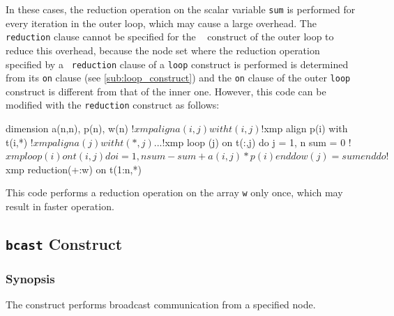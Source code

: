 \begin{description}

In these cases, the reduction operation on the scalar variable {\tt sum}
is performed for every iteration in the outer loop, which may cause a
large overhead.
The {\tt reduction} clause cannot be specified for the {\tt
{}} construct of the outer loop to reduce this overhead,
%
because the node set where the reduction operation specified by a {\tt
reduction} clause of a {\tt loop} construct is performed is determined
from its {\tt on} clause (see \ref{sub:loop_construct}) and
the {\tt on} clause of the outer {\tt loop} construct is different from
that of the inner one. 
%
However, this code can be modified with the {\tt reduction}
construct as follows: 

\begin{XFexample}
      dimension a(n,n), p(n), w(n)
!$xmp align a(i,j) with t(i,j)
!$xmp align p(i) with t(i,*)
!$xmp align a(j) with t(*,j)
      ...
!$xmp loop (j) on t(:,j)
      do j = 1, n
          sum = 0
!$xmp loop (i) on t(i,j) 
          do i = 1, n
              sum - sum + a(i,j) * p(i)
          end do
          w(j) = sum
      end do
!$xmp reduction(+:w) on t(1:n,*)
\end{XFexample}

This code performs a reduction operation on the array {\tt w} only once,
which may result in faster operation.  

\end{description}


\subsection{{\tt bcast} Construct}

\subsubsection*{Synopsis}

The {\tt {}} construct performs broadcast communication
from a specified node.

